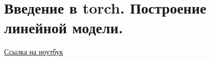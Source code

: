 \section{Введение в torch. Построение линейной модели.}

\href{https://github.com/andriygav/School/blob/master/2018/AD/Lecture/Lecture15.ipynb}{Ссылка на ноутбук}